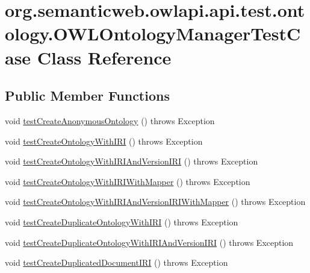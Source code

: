 \hypertarget{classorg_1_1semanticweb_1_1owlapi_1_1api_1_1test_1_1ontology_1_1_o_w_l_ontology_manager_test_case}{\section{org.\-semanticweb.\-owlapi.\-api.\-test.\-ontology.\-O\-W\-L\-Ontology\-Manager\-Test\-Case Class Reference}
\label{classorg_1_1semanticweb_1_1owlapi_1_1api_1_1test_1_1ontology_1_1_o_w_l_ontology_manager_test_case}
}
\subsection*{Public Member Functions}
\begin{DoxyCompactItemize}
\item 
void \hyperlink{classorg_1_1semanticweb_1_1owlapi_1_1api_1_1test_1_1ontology_1_1_o_w_l_ontology_manager_test_case_ae989f5408ea0e59b64264e5a44b1b4d3}{test\-Create\-Anonymous\-Ontology} ()  throws Exception 
\item 
void \hyperlink{classorg_1_1semanticweb_1_1owlapi_1_1api_1_1test_1_1ontology_1_1_o_w_l_ontology_manager_test_case_aaed58635102be5a27178eb31b2b55e44}{test\-Create\-Ontology\-With\-I\-R\-I} ()  throws Exception 
\item 
void \hyperlink{classorg_1_1semanticweb_1_1owlapi_1_1api_1_1test_1_1ontology_1_1_o_w_l_ontology_manager_test_case_aaae1f12050ced15de40ae9aeb50fa2d7}{test\-Create\-Ontology\-With\-I\-R\-I\-And\-Version\-I\-R\-I} ()  throws Exception 
\item 
void \hyperlink{classorg_1_1semanticweb_1_1owlapi_1_1api_1_1test_1_1ontology_1_1_o_w_l_ontology_manager_test_case_abb1a8f2ae6075080f2e83fa96dd26009}{test\-Create\-Ontology\-With\-I\-R\-I\-With\-Mapper} ()  throws Exception 
\item 
void \hyperlink{classorg_1_1semanticweb_1_1owlapi_1_1api_1_1test_1_1ontology_1_1_o_w_l_ontology_manager_test_case_a5f2d2da01c7652646468c2bd08c11ddb}{test\-Create\-Ontology\-With\-I\-R\-I\-And\-Version\-I\-R\-I\-With\-Mapper} ()  throws Exception 
\item 
void \hyperlink{classorg_1_1semanticweb_1_1owlapi_1_1api_1_1test_1_1ontology_1_1_o_w_l_ontology_manager_test_case_a7d648983524019d6b309ef039f2ae20d}{test\-Create\-Duplicate\-Ontology\-With\-I\-R\-I} ()  throws Exception 
\item 
void \hyperlink{classorg_1_1semanticweb_1_1owlapi_1_1api_1_1test_1_1ontology_1_1_o_w_l_ontology_manager_test_case_a62ac019a2bfae0001ddb8bd31c61c087}{test\-Create\-Duplicate\-Ontology\-With\-I\-R\-I\-And\-Version\-I\-R\-I} ()  throws Exception 
\item 
void \hyperlink{classorg_1_1semanticweb_1_1owlapi_1_1api_1_1test_1_1ontology_1_1_o_w_l_ontology_manager_test_case_a443e181ff1aa0aec503e46d6822bf352}{test\-Create\-Duplicated\-Document\-I\-R\-I} ()  throws Exception 
\end{DoxyCompactItemize}


